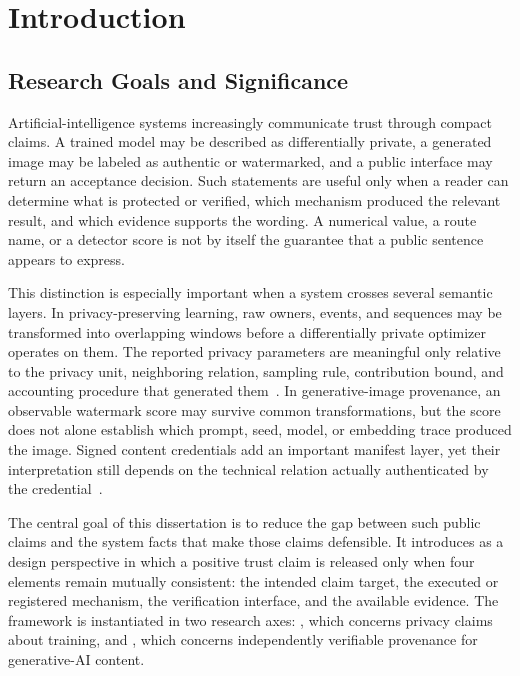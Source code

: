 \chapter{Introduction}
\label{ch:introduction}

\section{Research Goals and Significance}
\label{sec:ch1-goals}

Artificial-intelligence systems increasingly communicate trust through compact
claims.  A trained model may be described as differentially private, a generated
image may be labeled as authentic or watermarked, and a public interface may
return an acceptance decision.  Such statements are useful only when a reader can
determine what is protected or verified, which mechanism produced the relevant
result, and which evidence supports the wording.  A numerical value, a route
name, or a detector score is not by itself the guarantee that a public sentence
appears to express.

This distinction is especially important when a system crosses several semantic
layers.  In privacy-preserving learning, raw owners, events, and sequences may be
transformed into overlapping windows before a differentially private optimizer
operates on them.  The reported privacy parameters are meaningful only relative
to the privacy unit, neighboring relation, sampling rule, contribution bound, and
accounting procedure that generated them~\cite{dwork2014algorithmic,
kifer2020guidelines,ponomareva2023dpify,near2025guidelines}.  In generative-image
provenance, an observable watermark score may survive common transformations,
but the score does not alone establish which prompt, seed, model, or embedding
trace produced the image.  Signed content credentials add an important manifest
layer, yet their interpretation still depends on the technical relation actually
authenticated by the credential~\cite{longpre2024provenance,c2pa2026spec}.

The central goal of this dissertation is to reduce the gap between such public
claims and the system facts that make those claims defensible.  It introduces
\ClaimAlignedAssurance{} as a design perspective in which a positive trust claim
is released only when four elements remain mutually consistent: the intended
claim target, the executed or registered mechanism, the verification interface,
and the available evidence.  The framework is instantiated in two research axes:
\AuditablePrivacy{}, which concerns privacy claims about training, and
\SecurePublicVerification{}, which concerns independently verifiable provenance
for generative-AI content.


